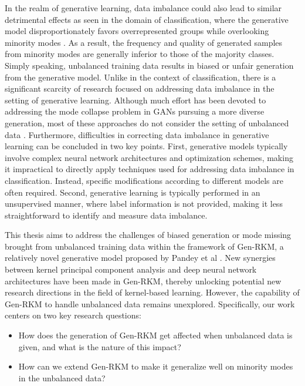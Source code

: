In the realm of generative learning, data imbalance could also lead to similar detrimental effects as seen in the domain of classification, where the generative model disproportionately favors overrepresented groups while overlooking minority modes \cite{choiFairGenerativeModeling2020,gerychDebiasingPretrainedGenerative2023}. As a result, the frequency and quality of generated samples from minority modes are generally inferior to those of the majority classes. Simply speaking, unbalanced training data results in biased or unfair generation from the generative model. Unlike in the context of classification, there is a significant scarcity of research focused on addressing data imbalance in the setting of generative learning. Although much effort has been devoted to addressing the mode collapse problem in GANs pursuing a more diverse generation, most of these approaches do not consider the setting of unbalanced data \cite{goodfellowGenerativeAdversarialNets2014,kossaleModeCollapseGenerative2022}. Furthermore, difficulties in correcting data imbalance in generative learning can be concluded in two key points. First, generative models typically involve complex neural network architectures and optimization schemes, making it impractical to directly apply techniques used for addressing data imbalance in classification. Instead, specific modifications according to different models are often required. Second, generative learning is typically performed in an unsupervised manner, where label information is not provided, making it less straightforward to identify and measure data imbalance.

This thesis aims to address the challenges of biased generation or mode missing brought from unbalanced training data within the framework of Gen-RKM, a relatively novel generative model proposed by Pandey et al \cite{pandeyGenerativeRestrictedKernel2021}. New synergies between kernel principal component analysis and deep neural network architectures have been made in Gen-RKM, thereby unlocking potential new research directions in the field of kernel-based learning. However, the capability of Gen-RKM to handle unbalanced data remains unexplored. Specifically, our work centers on two key research questions:
\begin{itemize}[label={--}]
    \item How does the generation of Gen-RKM get affected when unbalanced data is given, and what is the nature of this impact?
    \item How can we extend Gen-RKM to make it generalize well on minority modes in the unbalanced data?
\end{itemize}

